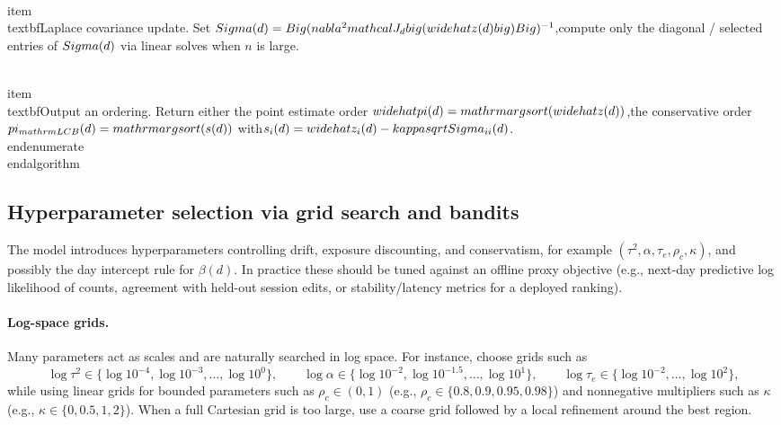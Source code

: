 \documentclass[11pt]{article}
\begin{document}
\\item \\textbf{Laplace covariance update.}
Set $\\Sigma(d)=\\Big(\\nabla^2\\mathcal J_d\\big(\\widehat z(d)\\big)\\Big)^{-1}$,\nor compute only the diagonal / selected entries of $\\Sigma(d)$ via linear solves when $n$ is large.

\\item \\textbf{Output an ordering.}
Return either the point estimate order $\\widehat\\pi(d)=\\mathrm{argsort}(\\widehat z(d))$,\nor the conservative order $\\pi_{\\mathrm{LCB}}(d)=\\mathrm{argsort}(s(d))$ with\n$s_i(d)=\\widehat z_i(d)-\\kappa\\sqrt{\\Sigma_{ii}(d)}$.
\\end{enumerate}
\\end{algorithm}

\subsection{Hyperparameter selection via grid search and bandits}
The model introduces hyperparameters controlling drift, exposure discounting, and conservatism, for example
$(\tau^2,\alpha,\tau_e,\rho_c,\kappa)$, and possibly the day intercept rule for $\beta(d)$.
In practice these should be tuned against an offline proxy objective (e.g., next-day predictive log likelihood of counts,
agreement with held-out session edits, or stability/latency metrics for a deployed ranking).

\paragraph{Log-space grids.}
Many parameters act as scales and are naturally searched in log space.
For instance, choose grids such as
\[
\log \tau^2 \in \{\log 10^{-4},\log 10^{-3},\dots,\log 10^{0}\},
\qquad
\log \alpha \in \{\log 10^{-2},\log 10^{-1.5},\dots,\log 10^{1}\},
\qquad
\log \tau_e \in \{\log 10^{-2},\dots,\log 10^{2}\},
\]
while using linear grids for bounded parameters such as $\rho_c\in(0,1)$ (e.g., $\rho_c\in\{0.8,0.9,0.95,0.98\}$)
and nonnegative multipliers such as $\kappa$ (e.g., $\kappa\in\{0,0.5,1,2\}$).
When a full Cartesian grid is too large, use a coarse grid followed by a local refinement around the best region.
\end{document}
